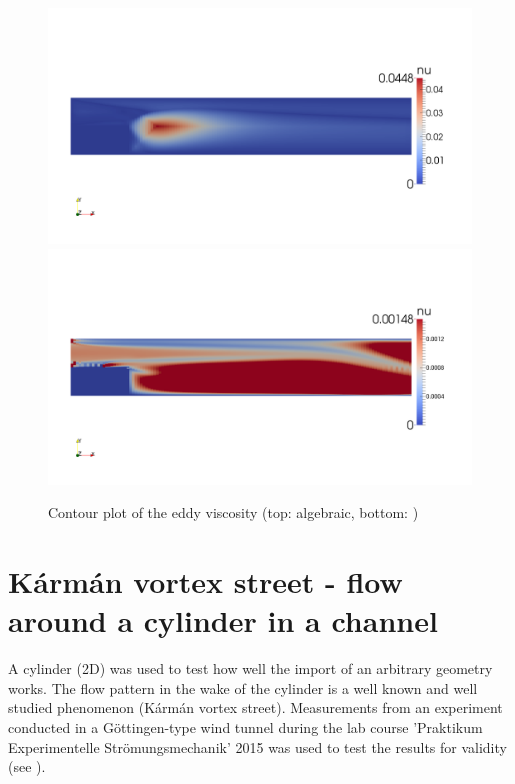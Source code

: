 \begin{figure}[!htb]
\centering
\includegraphics[trim=0 200 0 200,clip,width=1.0\textwidth]{FIGURES/bfs-aturb.png}
\includegraphics[trim=0 200 0 200,clip,width=1.0\textwidth]{FIGURES/bfs-ke.png}
\caption{Contour plot of the eddy viscosity (top: algebraic, bottom: \ke)}
\label{fig:bfsnut}
\end{figure} 


\clearpage
\section{K\'{a}rm\'{a}n vortex street - flow around a cylinder in a channel} %
\label{sec:karman_vortex_street_flow_around_a_cylinder_in_a_channel}

A cylinder (2D) was used to test how well the import of an arbitrary geometry works. The flow pattern in the wake of the cylinder is a well known and well studied phenomenon (K\'{a}rm\'{a}n vortex street). Measurements from an experiment conducted in a G\"ottingen-type wind tunnel during the lab course 'Praktikum Experimentelle Str\"omungsmechanik' 2015 was used to test the results for validity (see \citep{koehler2015}).

